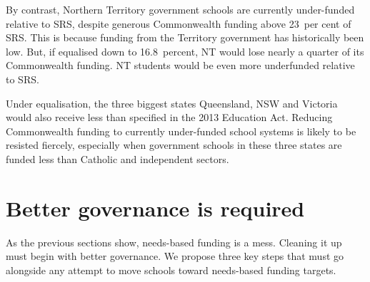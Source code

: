 \documentclass{grattan}
\begin{document}
By contrast, Northern Territory government schools are currently under-funded relative to SRS, despite generous Commonwealth funding above 23~per cent of SRS\@. This is because funding from the Territory government has historically been low. But, if equalised down to 16.8~percent, NT would lose nearly a quarter of its Commonwealth funding.
NT students would be even more underfunded relative to SRS\@.

Under equalisation, the three biggest states Queensland, NSW and Victoria would also receive less than specified in the 2013 Education Act.
Reducing Commonwealth funding to currently under-funded school systems is likely to be resisted fiercely, especially when government schools in these three states are funded less than Catholic and independent sectors.

\section{Better governance is required}\label{sec:the-srs-formula-must-be-reviewed-and-governance-arrangements-strengthened}


As the previous sections show, needs-based funding is a mess.
Cleaning it up must begin with better governance.
We propose three key steps that must go alongside any attempt to move schools toward needs-based funding targets.
\end{document}
